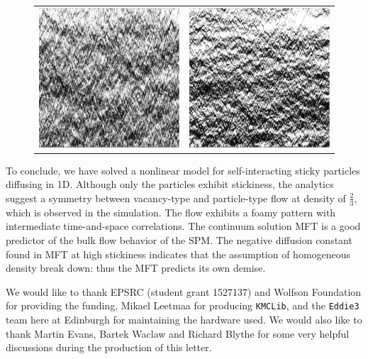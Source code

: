 \documentclass[
reprint,
 amsmath,amssymb,
 aps,
 prl,
]{revtex4-1}
\begin{document}
\begin{figure}[h!]
\begin{center}
\begin{tabular}{c | c}
    \includegraphics[width=0.49\linewidth]{longTime} &\includegraphics[width=0.49\linewidth]{midLongTime}
    \end{tabular}
\end{center}
    \vspace{-2em}
\end{figure}


To conclude, we have solved a nonlinear model for self-interacting sticky particles diffusing in 1D.  Although only the particles exhibit stickiness,  the analytics suggest a symmetry between vacancy-type and particle-type flow
at density of $\frac{2}{3}$, which is observed in the simulation.  The flow exhibits a foamy pattern with intermediate time-and-space correlations.  The continuum solution MFT is a good predictor of the bulk flow behavior of the SPM.
The negative diffusion constant found in MFT at high stickiness indicates  that the assumption of homogeneous density break down: thus the MFT predicts its own demise.

We would like to thank EPSRC (student grant 1527137) and Wolfson Foundation for providing the funding, Mikael Leetmaa for producing \texttt{KMCLib}, and the \texttt{Eddie3} team here at Edinburgh for maintaining the hardware used.
We would also like to thank Martin Evans, Bartek Waclaw and Richard Blythe for some very helpful discussions during the production of this letter.


\end{document}
